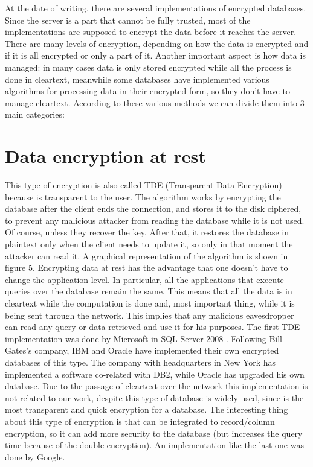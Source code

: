 At the date of writing, there are several implementations of encrypted databases.
Since the server is a part that cannot be fully trusted, most of the implementations are supposed to encrypt the data before it reaches the server. 
There are many levels of encryption, depending on how the data is encrypted and if it is all encrypted or only a part of it.
Another important aspect is how data is managed: in many cases data is only stored encrypted while all the process is done in cleartext, meanwhile some databases have implemented various algorithms for processing data in their encrypted form, so they don't have to manage cleartext.
According to these various methods we can divide them into 3 main categories:
\section{Data encryption at rest}
This type of encryption is also called TDE (Transparent Data Encryption) because is transparent to the user. 
The algorithm works by encrypting the database after the client ends the connection, and stores it to the disk ciphered, to prevent any malicious attacker from reading the database while it is not used. Of course, unless they recover the key. After that, it restores the database in plaintext only when the client needs to update it, so only in that moment the attacker can read it. A graphical representation of the algorithm is shown in figure 5. 
Encrypting data at rest has the advantage that one doesn't have to change the application level. In particular, all the applications that execute queries over the database remain the same. 
This means that all the data is in cleartext while the computation is done and, most important thing, while it is being sent through the network. This implies that any malicious eavesdropper can read any query or data retrieved and use it for his purposes.  
The first TDE implementation was done by Microsoft in SQL Server 2008 \cite{microsoft}.
Following Bill Gates's company, IBM \cite{ibm} and Oracle \cite{oracle} have implemented their own encrypted databases of this type. 
The company with headquarters in New York has implemented a software co-related with DB2, while Oracle has upgraded his own database.
Due to the passage of cleartext over the network this implementation is not related to our work, despite this type of database is widely used, since is the most transparent and quick encryption for a database. 
The interesting thing about this type of encryption is that can be integrated to record/column encryption, so it can add more security to the database (but increases the query time because of the double encryption). An implementation like the last one was done by Google\cite{google}.
